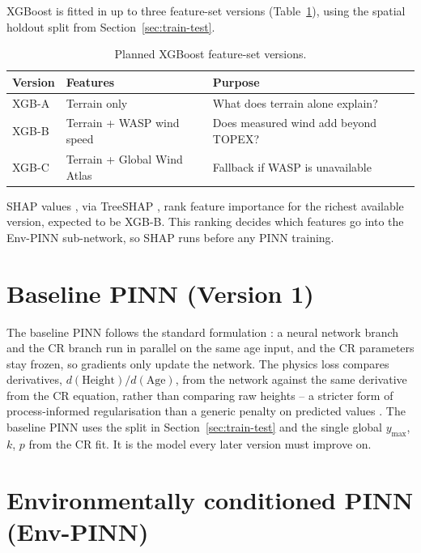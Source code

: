 XGBoost \citep{chen2016XGBoostScalableTree} is fitted in up to three feature-set versions (Table~\ref{tab:xgb-versions}), using the spatial holdout split from Section~\ref{sec:train-test}.

\begin{table}[h]
\centering
\begin{tabular}{lll}
\toprule
Version & Features & Purpose \\
\midrule
XGB-A & Terrain only & What does terrain alone explain? \\
XGB-B & Terrain + WASP wind speed & Does measured wind add beyond TOPEX? \\
XGB-C & Terrain + Global Wind Atlas & Fallback if WASP is unavailable \\
\bottomrule
\end{tabular}
\caption{Planned XGBoost feature-set versions.}
\label{tab:xgb-versions}
\end{table}

SHAP values \citep{lundberg2017UnifiedApproachInterpreting}, via TreeSHAP \citep{lundberg2020LocalExplanationsGlobal}, rank feature importance for the richest available version, expected to be XGB-B. This ranking decides which features go into the Env-PINN sub-network, so SHAP runs before any PINN training.

\section{Baseline PINN (Version 1)}

The baseline PINN follows the standard formulation \citep{raissi2019PhysicsinformedNeuralNetworks}: a neural network branch and the CR branch run in parallel on the same age input, and the CR parameters stay frozen, so gradients only update the network. The physics loss compares derivatives, $d(\text{Height})/d(\text{Age})$, from the network against the same derivative from the CR equation, rather than comparing raw heights -- a stricter form of process-informed regularisation than a generic penalty on predicted values \citep{wesselkamp2024ProcessInformedNeuralNetworks}. The baseline PINN uses the split in Section~\ref{sec:train-test} and the single global $y_{\max}$, $k$, $p$ from the CR fit. It is the model every later version must improve on.

\section{Environmentally conditioned PINN (Env-PINN)}

